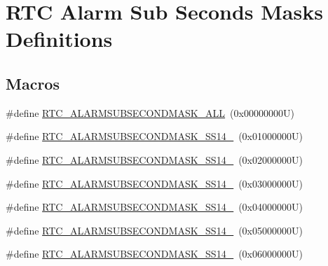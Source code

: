 \hypertarget{group___r_t_c___alarm___sub___seconds___masks___definitions}{}\section{R\+TC Alarm Sub Seconds Masks Definitions}
\label{group___r_t_c___alarm___sub___seconds___masks___definitions}
\subsection*{Macros}
\begin{DoxyCompactItemize}
\item 
\#define \hyperlink{group___r_t_c___alarm___sub___seconds___masks___definitions_gaf96ae2bcfc62e92473372c4510d517d5}{R\+T\+C\+\_\+\+A\+L\+A\+R\+M\+S\+U\+B\+S\+E\+C\+O\+N\+D\+M\+A\+S\+K\+\_\+\+A\+LL}~(0x00000000\+U)
\item 
\#define \hyperlink{group___r_t_c___alarm___sub___seconds___masks___definitions_ga382ddfaca27c4b547c69878a320aab43}{R\+T\+C\+\_\+\+A\+L\+A\+R\+M\+S\+U\+B\+S\+E\+C\+O\+N\+D\+M\+A\+S\+K\+\_\+\+S\+S14\+\_}~(0x01000000\+U)
\item 
\#define \hyperlink{group___r_t_c___alarm___sub___seconds___masks___definitions_gad627f4e6c83537e1d5b8c657f91d6bcf}{R\+T\+C\+\_\+\+A\+L\+A\+R\+M\+S\+U\+B\+S\+E\+C\+O\+N\+D\+M\+A\+S\+K\+\_\+\+S\+S14\+\_}~(0x02000000\+U)
\item 
\#define \hyperlink{group___r_t_c___alarm___sub___seconds___masks___definitions_gaeb5fb21c4ef0d54ca1515564563c0487}{R\+T\+C\+\_\+\+A\+L\+A\+R\+M\+S\+U\+B\+S\+E\+C\+O\+N\+D\+M\+A\+S\+K\+\_\+\+S\+S14\+\_}~(0x03000000\+U)
\item 
\#define \hyperlink{group___r_t_c___alarm___sub___seconds___masks___definitions_ga6f9b0a78f9723a20b1f94b5581e04194}{R\+T\+C\+\_\+\+A\+L\+A\+R\+M\+S\+U\+B\+S\+E\+C\+O\+N\+D\+M\+A\+S\+K\+\_\+\+S\+S14\+\_}~(0x04000000\+U)
\item 
\#define \hyperlink{group___r_t_c___alarm___sub___seconds___masks___definitions_gafc0252b2f8a935811dadd3d6b8ea3574}{R\+T\+C\+\_\+\+A\+L\+A\+R\+M\+S\+U\+B\+S\+E\+C\+O\+N\+D\+M\+A\+S\+K\+\_\+\+S\+S14\+\_}~(0x05000000\+U)
\item 
\#define \hyperlink{group___r_t_c___alarm___sub___seconds___masks___definitions_ga60fab8d647e6f8500926a0db2dff94d8}{R\+T\+C\+\_\+\+A\+L\+A\+R\+M\+S\+U\+B\+S\+E\+C\+O\+N\+D\+M\+A\+S\+K\+\_\+\+S\+S14\+\_}~(0x06000000\+U)
\item 

\end{DoxyCompactItemize}
